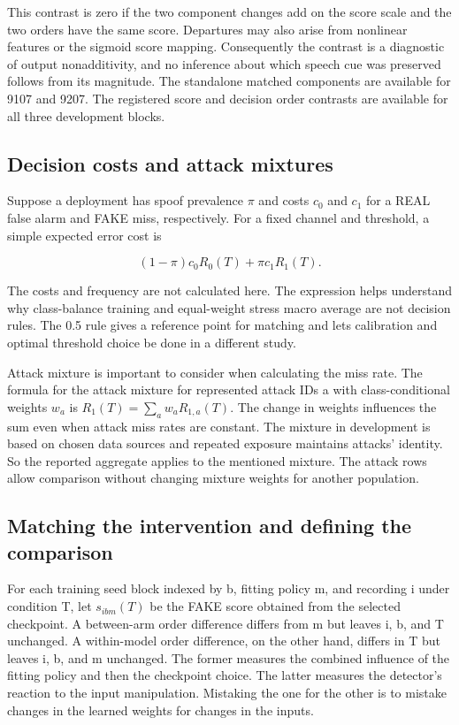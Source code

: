 This contrast is zero if the two component changes add on the score scale and the two orders have the same score. Departures may also arise from nonlinear features or the sigmoid score mapping. Consequently the contrast is a diagnostic of output nonadditivity, and no inference about which speech cue was preserved follows from its magnitude. The standalone matched components are available for 9107 and 9207. The registered score and decision order contrasts are available for all three development blocks.

\subsection{Decision costs and attack mixtures}

Suppose a deployment has spoof prevalence \(\pi\) and costs \(c_0\) and \(c_1\) for a REAL false alarm and FAKE miss, respectively. For a fixed channel and threshold, a simple expected error cost is

\begin{equation}
 (1-\pi)c_0 R_0(T)+\pi c_1 R_1(T).
\end{equation}

The costs and frequency are not calculated here. The expression helps understand why class-balance training and equal-weight stress macro average are not decision rules. The 0.5 rule gives a reference point for matching and lets calibration and optimal threshold choice be done in a different study.

Attack mixture is important to consider when calculating the miss rate. The formula for the attack mixture for represented attack IDs a with class-conditional weights \(w_a\) is \(R_1(T)=\sum_a w_a R_{1,a}(T)\). The change in weights influences the sum even when attack miss rates are constant. The mixture in development is based on chosen data sources and repeated exposure maintains attacks' identity. So the reported aggregate applies to the mentioned mixture. The attack rows allow comparison without changing mixture weights for another population.

\subsection{Matching the intervention and defining the comparison}

For each training seed block indexed by b, fitting policy m, and recording i under condition T, let \(s_{ibm}(T)\) be the FAKE score obtained from the selected checkpoint. A between-arm order difference differs from m but leaves i, b, and T unchanged. A within-model order difference, on the other hand, differs in T but leaves i, b, and m unchanged. The former measures the combined influence of the fitting policy and then the checkpoint choice. The latter measures the detector's reaction to the input manipulation. Mistaking the one for the other is to mistake changes in the learned weights for changes in the inputs.


